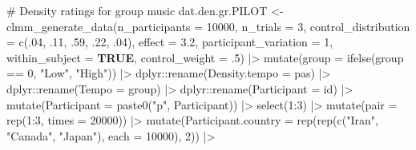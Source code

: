 \documentclass[
  bookmarksnumbered]{article}
\newenvironment{Shaded}{\begin{snugshade}}{\end{snugshade}}
\newcommand{\AttributeTok}[1]{\textcolor[rgb]{0.80,0.80,0.80}{#1}}
\newcommand{\CommentTok}[1]{\textcolor[rgb]{0.50,0.62,0.50}{#1}}
\newcommand{\ConstantTok}[1]{\textcolor[rgb]{0.86,0.64,0.64}{\textbf{#1}}}
\newcommand{\DecValTok}[1]{\textcolor[rgb]{0.86,0.86,0.80}{#1}}
\newcommand{\FloatTok}[1]{\textcolor[rgb]{0.75,0.75,0.82}{#1}}
\newcommand{\FunctionTok}[1]{\textcolor[rgb]{0.94,0.94,0.56}{#1}}
\newcommand{\NormalTok}[1]{\textcolor[rgb]{0.80,0.80,0.80}{#1}}
\newcommand{\OtherTok}[1]{\textcolor[rgb]{0.94,0.94,0.56}{#1}}
\newcommand{\SpecialCharTok}[1]{\textcolor[rgb]{0.86,0.64,0.64}{#1}}
\newcommand{\StringTok}[1]{\textcolor[rgb]{0.80,0.58,0.58}{#1}}
\begin{document}
\begin{Shaded}
\begin{Highlighting}[]
\CommentTok{\# Density ratings for group music}
\NormalTok{dat.den.gr.PILOT }\OtherTok{\textless{}{-}} \FunctionTok{clmm\_generate\_data}\NormalTok{(}\AttributeTok{n\_participants =} \DecValTok{10000}\NormalTok{,}
                           \AttributeTok{n\_trials =} \DecValTok{3}\NormalTok{,}
                           \AttributeTok{control\_distribution =} \FunctionTok{c}\NormalTok{(.}\DecValTok{04}\NormalTok{, .}\DecValTok{11}\NormalTok{, .}\DecValTok{59}\NormalTok{, .}\DecValTok{22}\NormalTok{, .}\DecValTok{04}\NormalTok{),}
                           \AttributeTok{effect =} \FloatTok{3.2}\NormalTok{,}
                           \AttributeTok{participant\_variation =} \DecValTok{1}\NormalTok{,}
                           \AttributeTok{within\_subject =} \ConstantTok{TRUE}\NormalTok{,}
                           \AttributeTok{control\_weight =}\NormalTok{ .}\DecValTok{5}\NormalTok{) }\SpecialCharTok{|\textgreater{}}
  \FunctionTok{mutate}\NormalTok{(}\AttributeTok{group =} \FunctionTok{ifelse}\NormalTok{(group }\SpecialCharTok{==} \DecValTok{0}\NormalTok{, }\StringTok{"Low"}\NormalTok{, }\StringTok{"High"}\NormalTok{)) }\SpecialCharTok{|\textgreater{}}
\NormalTok{  dplyr}\SpecialCharTok{::}\FunctionTok{rename}\NormalTok{(}\AttributeTok{Density.tempo =}\NormalTok{ pas) }\SpecialCharTok{|\textgreater{}}
\NormalTok{  dplyr}\SpecialCharTok{::}\FunctionTok{rename}\NormalTok{(}\AttributeTok{Tempo =}\NormalTok{ group) }\SpecialCharTok{|\textgreater{}}
\NormalTok{  dplyr}\SpecialCharTok{::}\FunctionTok{rename}\NormalTok{(}\AttributeTok{Participant =}\NormalTok{ id) }\SpecialCharTok{|\textgreater{}}
  \FunctionTok{mutate}\NormalTok{(}\AttributeTok{Participant =} \FunctionTok{paste0}\NormalTok{(}\StringTok{"p"}\NormalTok{, Participant)) }\SpecialCharTok{|\textgreater{}}
  \FunctionTok{select}\NormalTok{(}\DecValTok{1}\SpecialCharTok{:}\DecValTok{3}\NormalTok{) }\SpecialCharTok{|\textgreater{}}
  \FunctionTok{mutate}\NormalTok{(}\AttributeTok{pair =} \FunctionTok{rep}\NormalTok{(}\DecValTok{1}\SpecialCharTok{:}\DecValTok{3}\NormalTok{, }\AttributeTok{times =} \DecValTok{20000}\NormalTok{)) }\SpecialCharTok{|\textgreater{}}
  \FunctionTok{mutate}\NormalTok{(}\AttributeTok{Participant.country =} \FunctionTok{rep}\NormalTok{(}\FunctionTok{rep}\NormalTok{(}\FunctionTok{c}\NormalTok{(}\StringTok{"Iran"}\NormalTok{, }\StringTok{"Canada"}\NormalTok{, }\StringTok{"Japan"}\NormalTok{), }\AttributeTok{each =} \DecValTok{10000}\NormalTok{), }\DecValTok{2}\NormalTok{)) }\SpecialCharTok{|\textgreater{}}

\end{Highlighting}
\end{Shaded}
\end{document}
